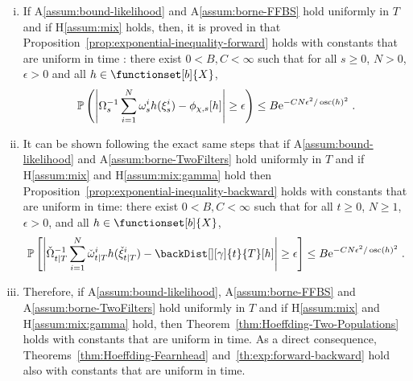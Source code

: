 \begin{rem}
\begin{enumerate}[(i)]
\item \label{it:exp:mix:for}If A\ref{assum:bound-likelihood} and A\ref{assum:borne-FFBS} hold uniformly in $T$ and if H\ref{assum:mix} holds, then, it is proved in \cite{douc:garivier:moulines:olsson:2011} that Proposition~\ref{prop:exponential-inequality-forward} holds with constants that are uniform in time : there exist $0 <B, C <\infty$ such that for all $s \geq 0$, $N > 0$, $\epsilon > 0$ and all $h \in \functionset[b]{X}$,
\begin{equation*}
\PP\left( \left| \sumwght{s}^{-1 } \sum_{i=1}^N \swght{s}{i} h(\epartpred{s}{i}) - \filt{\Xinit,s}[h] \right| \geq \epsilon \right) \leq B \rme^{-C N \epsilon^2 / \oscnorm{h}^2}\eqsp.
\end{equation*}
\item \label{it:exp:mix:back} It can be shown following the exact same steps that if A\ref{assum:bound-likelihood} and A\ref{assum:borne-TwoFilters} hold uniformly in $T$ and if H\ref{assum:mix} and H\ref{assum:mix:gamma} hold then Proposition~\ref{prop:exponential-inequality-backward} holds with constants that are uniform in time: there exist $0<B, C<\infty$  such that for all $t\geq 0$, $N\ge 1$, $\epsilon > 0$, and all $h \in \functionset[b]{X}$,
\[
\PP\left[ \left| \backsumwght{t}{T}^{-1} \sum_{i=1}^N \ebackwght{t}{T}{i} h(\ebackpart{t}{T}{i}) - \backDist[][\gamma]{t}{T}[h] \right| \geq \epsilon \right] \leq B\rme^{-C N \epsilon^2 / \oscnorm{h}^2}  \eqsp.
\]
\item \label{it:exp:mix:twofilt} Therefore, if A\ref{assum:bound-likelihood}, A\ref{assum:borne-FFBS} and A\ref{assum:borne-TwoFilters} hold uniformly in $T$ and if H\ref{assum:mix} and H\ref{assum:mix:gamma} hold, then Theorem~\ref{thm:Hoeffding-Two-Populations} holds with constants that are uniform in time. As a direct consequence, Theorems~\ref{thm:Hoeffding-Fearnhead} and~\ref{th:exp:forward-backward} hold also with constants that are uniform in time.
\end{enumerate}
\end{rem}